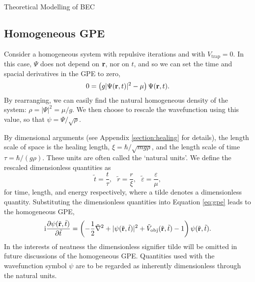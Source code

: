 \begin{chapter}{\label{cha:theoretical_model}Theoretical Modelling of BEC}
	\subsection{\label{section:gpedimlesshomg} Homogeneous GPE}
		Consider a homogeneous system with repulsive iterations and with $V_{\mathrm{trap}} = 0$. In this case, $\Psi$ does not depend on ${\bf r}$, nor on $t$, and so we can set the time and spacial derivatives in the GPE to zero,
		\begin{equation}
		0 = \left(g|\Psi({\bf r},t)|^2 - \mu \right) \Psi({\bf r},t).
		\end{equation}
		By rearranging, we can easily find the natural homogeneous density of the system: $\rho = |\Psi|^2 = \mu/g$. We then choose to rescale the wavefunction using this value, so that $\psi = \Psi/\sqrt{\rho}$.

		By dimensional arguments (see Appendix \ref{section:healing} for details), the length scale of space is the healing length, $\xi = \hbar/\sqrt{mg\rho}$, and the length scale of time $\tau = \hbar/(g\rho)$. These units are often called the `natural units'. We define the rescaled dimensionless quantities as
		\begin{equation}
			\tilde{t} = \frac{t}{\tau}, ~~~ \tilde{r} = \frac{r}{\xi}, ~~~ \tilde{\varepsilon} = \frac{\varepsilon}{\mu},
		\end{equation}
		for time, length, and energy respectively, where a tilde denotes a dimensionless quantity. Substituting the dimensionless quantities into Equation \ref{eq:gpe} leads to the homogeneous GPE,
		\begin{equation}\label{eq:dimgpehomg}
		\mathrm{i}\frac{\partial\psi({\tilde{\bf r}},\tilde{t})}{\partial {\tilde{t}}} = \left( -\frac{1}{2}\tilde{\nabla}^2 + |\psi({\tilde{\bf r}},\tilde{t})|^2 + \tilde{V}_{\mathrm{obj}}({\tilde{\bf r}},\tilde{t}) - 1 \right) \psi({\tilde{\bf r}},\tilde{t}).
		\end{equation}
		In the interests of neatness the dimensionless signifier tilde will be omitted in future discussions of the homogeneous GPE. Quantities used with the wavefunction symbol $\psi$ are to be regarded as inherently dimensionless through the natural units.


\end{chapter}
